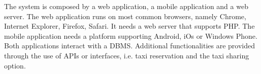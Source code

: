 The system is composed by a web application, a mobile application and a web server. The web application runs on most common browsers, namely Chrome, Internet Explorer, Firefox, Safari. It needs a web server that supports PHP. The mobile application needs a platform supporting Android, iOs or Windows Phone. Both applications interact with a DBMS.\newline
Additional functionalities are provided through the use of APIs or interfaces, i.e. taxi reservation and the taxi sharing option.
